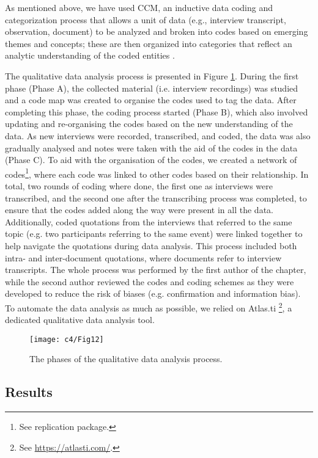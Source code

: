 As mentioned above, we have used CCM, an inductive data coding and categorization process that allows a unit of data (e.g., interview transcript, observation, document) to be analyzed and broken into codes based on emerging themes and concepts; these are then organized into categories that reflect an analytic understanding of the coded entities \cite{Mathison2005}.

The qualitative data analysis process is presented in Figure \ref{c4:fig:qualitative-analysis}. During the first phase (Phase A), the collected material (i.e. interview recordings) was studied and a code map was created to organise the codes used to tag the data.
After completing this phase, the coding process started (Phase B), which also involved updating and re-organising the codes based on the new understanding of the data.
As new interviews were recorded, transcribed, and coded, the data was also gradually analysed and notes were taken with the aid of the codes in the data (Phase C).
To aid with the organisation of the codes, we created a network of codes\footnote{See replication package.}, where each code was linked to other codes based on their relationship.
In total, two rounds of coding where done, the first one as interviews were transcribed, and the second one after the transcribing process was completed, to ensure that the codes added along the way were present in all the data.
Additionally, coded quotations from the interviews that referred to the same topic (e.g. two participants referring to the same event) were linked together to help navigate the quotations during data analysis. This process included both intra- and inter-document quotations, where documents refer to interview transcripts.
The whole process was performed by the first author of the chapter, while the second author reviewed the codes and coding schemes as they were developed to reduce the risk of biases (e.g. confirmation and information bias).
To automate the data analysis as much as possible, we relied on Atlas.ti \footnote{See \url{https://atlasti.com/}.}, a dedicated qualitative data analysis tool.

\begin{figure}
    \centering
    \texttt{[image: c4/Fig12]}
    \caption{The phases of the qualitative data analysis process.}\label{c4:fig:qualitative-analysis}
\end{figure}

\subsection{Results}\label{c4:sec:results-rq-4-and-5}

